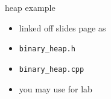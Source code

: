 \begin{frame}{heap example}
\begin{itemize}
\item linked off slides page as
\item \texttt{binary\_heap.h}
\item \texttt{binary\_heap.cpp}
\vspace{.5cm}
\item you may use for lab
\end{itemize}
\end{frame}
